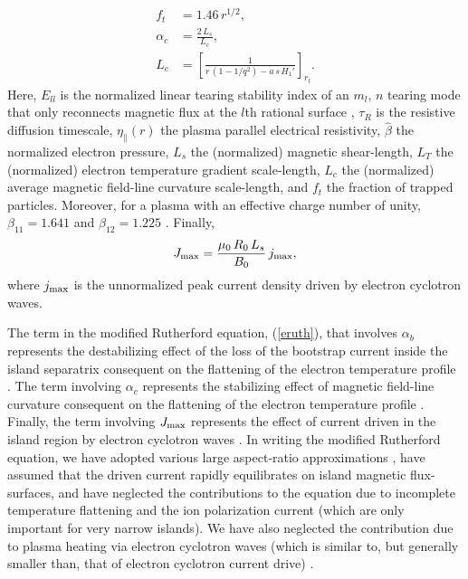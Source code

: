 \documentclass{iopjournal}
\begin{document}
{\begin{align}
f_t&= 1.46\,r^{1/2},\\[0.5ex]
\alpha_c &= \frac{2\,L_s}{L_c},\\[0.5ex]
L_c &= \left[\frac{1}{r\,(1-1/q^2) -a\,s\,H_1'}\right]_{r_l}.
\end{align}
Here, $E_{ll}$ is the  normalized linear tearing stability index of an $m_l$, $n$ tearing mode
 that only reconnects magnetic flux at the $l$th rational surface \cite{tear5}, $\tau_R$ is the resistive diffusion timescale, $\eta_\parallel(r)$  the plasma parallel electrical resistivity, $\hat{\beta}$ the normalized electron pressure, $L_s$  the (normalized) magnetic shear-length, 
$L_T$ the (normalized) electron temperature gradient scale-length, $L_c$ the (normalized) average magnetic field-line curvature scale-length, and $f_t$  the fraction of trapped particles. Moreover, for a plasma with an effective charge
number of unity, $\beta_{11}=1.641$ and $\beta_{12}= 1.225$ \cite{fitz}.
Finally,
\begin{equation}\label{ecur}
J_{\rm max} = \frac{\mu_0\,R_0\,L_s}{B_0}\,j_{\rm max},
\end{equation}
where $j_{\rm max}$ is the unnormalized peak current density driven by electron cyclotron waves.  
 
 The term in the modified Rutherford equation, (\ref{eruth}),  that involves $\alpha_b$  represents  the
 destabilizing effect of the loss of the bootstrap current inside the island separatrix consequent on the flattening of the electron temperature profile \cite{ntm2,car}. The term involving $\alpha_c$ represents  the stabilizing effect of  magnetic field-line curvature  consequent on the flattening of the electron temperature profile \cite{fitz,kot}. Finally, the term involving $J_{\rm max}$ represents the effect of current driven in the island region by electron cyclotron waves \cite{island}. In writing the modified
 Rutherford equation, we have adopted various large aspect-ratio approximations \cite{ggj1,fitz}, have assumed that the driven current rapidly equilibrates on
 island magnetic flux-surfaces, 
and have  neglected the contributions to the equation due to incomplete temperature flattening \cite{ntm2} and the ion polarization current \cite{polz} (which are only important for
 very narrow islands). We  have also neglected the contribution due to
 plasma heating via electron cyclotron waves (which is similar to, but generally smaller than, that of electron cyclotron current drive) \cite{ntm4,island}.
 
}
\end{document}
